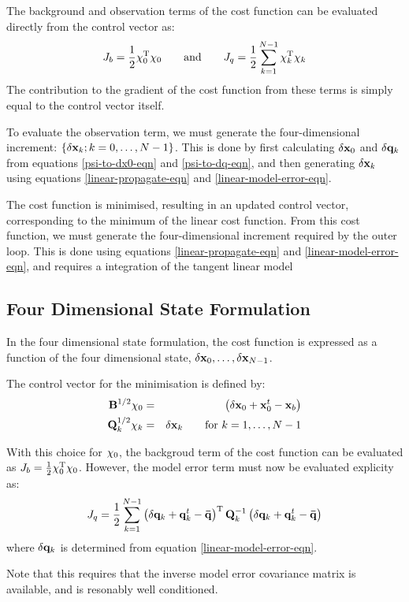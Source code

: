 \documentclass[12pt]{article}
\newcommand{\vect}[1]{{\bf #1}}                         %
\newcommand{\mat}[1]{{\bf #1}}                          %
\newcommand{\rmT}{{\rm T}}                           %
\begin{document}
The background and observation terms of the cost function can be evaluated
directly from the control vector as:
\begin{equation}
     J_b = \frac{1}{2} \vect{\chi}_0^\rmT \vect{\chi}_0 \qquad\mbox{and}\qquad
     J_q = \frac{1}{2} \sum_{k=1}^{N-1} \vect{\chi}_k^\rmT \vect{\chi}_k
\end{equation}
The contribution to the gradient of the cost function from these terms is
simply equal to the control vector itself.

To evaluate the observation term, we must generate the four-dimensional
increment: $\{ \delta\vect{x}_k ; k=0, \ldots , N-1\}$. This is done by
first calculating $\delta\vect{x}_0$ and $\delta\vect{q}_k$ from
equations \ref{psi-to-dx0-eqn} and \ref{psi-to-dq-eqn}, and then
generating $\delta\vect{x}_k$ using equations
\ref{linear-propagate-eqn} and \ref{linear-model-error-eqn}.

The cost function is minimised, resulting in an updated control vector,
corresponding to the minimum of the linear cost function. From this cost
function, we must generate the four-dimensional increment required
by the outer loop. This is done using equations
\ref{linear-propagate-eqn} and \ref{linear-model-error-eqn}, and
requires a integration of the tangent linear model

\subsection{Four Dimensional State Formulation}
In the four dimensional state formulation, the cost function is expressed
as a function of the four dimensional state,
$\delta\vect{x}_0 , \ldots , \delta\vect{x}_{N-1}$.

The control vector for the minimisation is defined by:
\begin{eqnarray}
  \label{psi-to-dx4d0-eqn}
  \mat{B}^{1/2} \vect{\chi}_0  &=& 
     \left( \delta\vect{x}_0 + \vect{x}^t_0 - \vect{x}_b \right) \\
  \label{psi-to-dx4dk-eqn}
  \mat{Q}_k^{1/2} \vect{\chi}_k  &=& \delta\vect{x}_k
     \qquad \mbox{for $k=1, \ldots , N-1$}
\end{eqnarray}

With this choice for $\vect{\chi}_0$, the backgroud term of the cost function
can be evaluated as $ J_b = \frac{1}{2} \vect{\chi}_0^\rmT \vect{\chi}_0 $.
However, the model error term must now be evaluated explicity as:
\begin{equation}
J_q =  \frac{1}{2} \sum_{k=1}^{N-1}
                       \left( \delta\vect{q}_k + \vect{q}^t_k
                                           - \vect{\bar q}  \right)^\rmT
                      \mat{Q}_k^{-1}
                       \left( \delta\vect{q}_k + \vect{q}^t_k
                                           - \vect{\bar q}  \right)
\end{equation}
where $\delta\vect{q}_k$ is determined from equation
\ref{linear-model-error-eqn}.

Note that this requires that the inverse model error covariance matrix is
available, and is resonably well conditioned.
\end{document}
